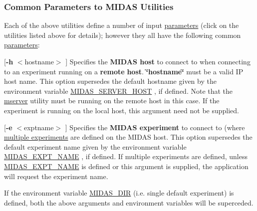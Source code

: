 \label{F_Utilities_List_idx_MIDAS-host}
\hypertarget{F_Utilities_List_idx_MIDAS-host}{}
 \label{F_Utilities_List_idx_MIDAS-experiment}
\hypertarget{F_Utilities_List_idx_MIDAS-experiment}{}
 \hypertarget{F_Utilities_List_F_utilities_params}{}\subsubsection{Common Parameters to MIDAS Utilities}\label{F_Utilities_List_F_utilities_params}
Each of the above utilities define a number of input \hyperlink{structparameters}{parameters} (click on the utilities listed above for details); however they all have the following common \hyperlink{structparameters}{parameters}:


\begin{DoxyItemize}
\item \mbox{[}{\bfseries -\/h} $<$hostname$>$ \mbox{]} Specifies the {\bfseries MIDAS host} to connect to when connecting to an experiment running on a {\bfseries remote} {\bfseries host}. {\bfseries \char`\"{}hostname\char`\"{}} must be a valid IP host name. This option supersedes the default hostname given by the environment variable \hyperlink{BuildingOptions_BO_MIDAS_SERVER_HOST}{MIDAS\_\-SERVER\_\-HOST} , if defined. Note that the \hyperlink{RC_customize_ODB_RC_mserver_utility}{mserver} utility must be running on the remote host in this case. If the experiment is running on the local host, this argument need not be supplied.
\end{DoxyItemize}


\begin{DoxyItemize}
\item \mbox{[}{\bfseries -\/e} $<$exptname$>$ \mbox{]} Specifies the {\bfseries MIDAS experiment} to connect to (where \hyperlink{Q_Linux_Q_Linux_Exptab}{multiple experiments} are defined on the MIDAS host. This option supersedes the default experiment name given by the environment variable \hyperlink{BuildingOptions_BO_MIDAS_EXPT_NAME}{MIDAS\_\-EXPT\_\-NAME} , if defined. If multiple experiments are defined, unless \hyperlink{BuildingOptions_BO_MIDAS_EXPT_NAME}{MIDAS\_\-EXPT\_\-NAME} is defined or this argument is supplied, the application will request the experiment name.
\end{DoxyItemize}

If the environment variable \hyperlink{BuildingOptions_BO_MIDAS_DIR}{MIDAS\_\-DIR} (i.e. single default experiment) is defined, both the above arguments and environment variables will be superceded.

